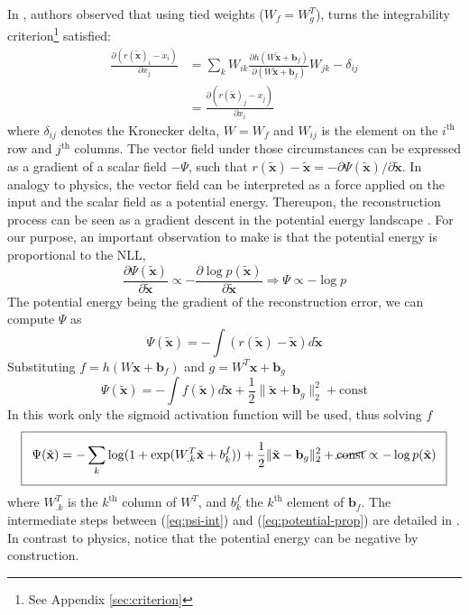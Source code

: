 In \citep{potentialenergy}, authors observed that using tied weights ($W_f = W_g^T$), turns the integrability criterion\footnote{See Appendix \ref{sec:criterion}} satisfied:
\begin{equation}
\begin{split}
\frac{\partial(r(\tilde{\mathbf{x}})_i- x_i)}{\partial x_j} &=  \sum_k W_{ik} \frac{\partial h(W\tilde{\mathbf{x}} + \mathbf{b}_f)}{\partial(W\tilde{\mathbf{x}} + \mathbf{b}_f)}W_{jk} - \delta_{ij}   \\
&= \frac{\partial(r(\tilde{\mathbf{x}})_j- x_j)}{\partial x_i}
\end{split}
\end{equation} 
where $\delta_{ij}$ denotes the Kronecker delta, $W=W_f$ and $W_{ij}$ is the element on the $i^{\text{th}}$ row and $j^{\text{th}}$ columns. The vector field under those circumstances can be expressed as a gradient of a scalar field $-\Psi$, such that $r(\tilde{\mathbf{x}}) - \tilde{\mathbf{x}} = -\partial \Psi(\tilde{\mathbf{x}})/\partial \tilde{\mathbf{x}}$. In analogy to physics, the vector field can be interpreted as a force applied on the input and the scalar field as a potential energy. Thereupon, the reconstruction process can be seen as a gradient descent in the potential energy landscape \citep{potentialenergy}. For our purpose, an important observation to make is that the potential energy is proportional to the NLL,
\begin{equation}
\frac{\partial \Psi(\tilde{\mathbf{x}})}{\partial \tilde{\mathbf{x}}} \propto -\frac{\partial \log p(\tilde{\mathbf{x}})}{\partial \tilde{\mathbf{x}}} \Rightarrow  \Psi \propto -\log p
\end{equation}
The potential energy being the gradient of the reconstruction error, we can compute $\Psi$ as
\begin{equation}
 \Psi(\tilde{\mathbf{x}}) = -\int (r(\tilde{\mathbf{x}}) - \tilde{\mathbf{x}})d\tilde{\mathbf{x}} 
 \label{eq:psi-int}
\end{equation}
Substituting $f = h(W\mathbf{x} + \mathbf{b}_f)$ and $g = W^T\mathbf{x} + \mathbf{b}_g$
\begin{equation}
\Psi(\tilde{\mathbf{x}})= -\int f(\tilde{\mathbf{x}})d\tilde{\mathbf{x}} + \frac{1}{2} \lVert \tilde{\mathbf{x}} + \textbf{b}_g \rVert_2^2 + \text{const}
\end{equation} 
In this work only the sigmoid activation function will be used, thus solving $f$
\newcommand\boxedB[1]{{\setlength\fboxsep{8pt}\boxed{#1}}}
\begin{equation}
\boxedB{\Psi(\tilde{\mathbf{x}}) =  -\sum_k \log(1 + \text{exp}(W_{.k}^T \tilde{\mathbf{x}} + b_k^f)) + \frac{1}{2} \lVert \tilde{\mathbf{x}} - \textbf{b}_g \rVert_2^2 + \cancel{\text{const}} \propto -\log p(\tilde{\mathbf{x}})}
\label{eq:potential-prop}
\end{equation}
where $W_{.k}^T$ is the $k^{\text{th}}$ column of $W^T$, and $b_k^f$ the $k^{\text{th}}$ element of $\textbf{b}_f$. The intermediate steps between (\ref{eq:psi-int}) and (\ref{eq:potential-prop}) are detailed in \citep{potentialenergy}. In contrast to physics, notice that the potential energy can be negative by construction. 

